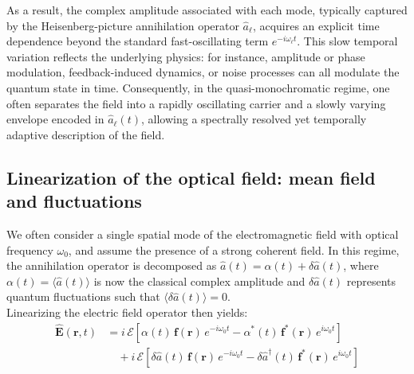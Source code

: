 As a result, the complex amplitude associated with each mode, typically captured by the Heisenberg-picture annihilation operator $\hat{a}_\ell$, acquires an explicit time dependence beyond the standard fast-oscillating term $e^{-i\omega_\ell t}$. This slow temporal variation reflects the underlying physics: for instance, amplitude or phase modulation, feedback-induced dynamics, or noise processes can all modulate the quantum state in time. Consequently, in the quasi-monochromatic regime, one often separates the field into a rapidly oscillating carrier and a slowly varying envelope encoded in $\hat{a}_\ell(t)$, allowing a spectrally resolved yet temporally adaptive description of the field. \\

\subsection*{Linearization of the optical field: mean field and fluctuations}

We often consider a single spatial mode of the electromagnetic field with optical frequency \(\omega_0\), and assume the presence of a strong coherent field. In this regime, the annihilation operator is decomposed as \(\hat{a}(t) = \alpha(t) + \delta\hat{a}(t)\), where \(\alpha(t)=\langle \hat{a}(t)\rangle\) is now the classical complex amplitude and \(\delta\hat{a}(t)\) represents quantum fluctuations such that \(\langle \delta \hat{a}(t)\rangle=0\). \\ 

Linearizing the electric field operator then yields:
\begin{equation}
\begin{aligned}
\hat{\mathbf{E}}(\mathbf{r}, t) 
&= i \, \mathcal{E} \left[ \alpha(t)\, \mathbf{f}(\mathbf{r})\, e^{-i \omega_0 t} 
- \alpha^*(t)\, \mathbf{f}^*(\mathbf{r})\, e^{i \omega_0 t} \right] \\
&\quad + i \, \mathcal{E} \left[ \delta \hat{a}(t)\, \mathbf{f}(\mathbf{r})\, e^{-i \omega_0 t}
- \delta \hat{a}^\dagger(t)\, \mathbf{f}^*(\mathbf{r})\, e^{i \omega_0 t} \right]
\end{aligned}
\end{equation} \\

